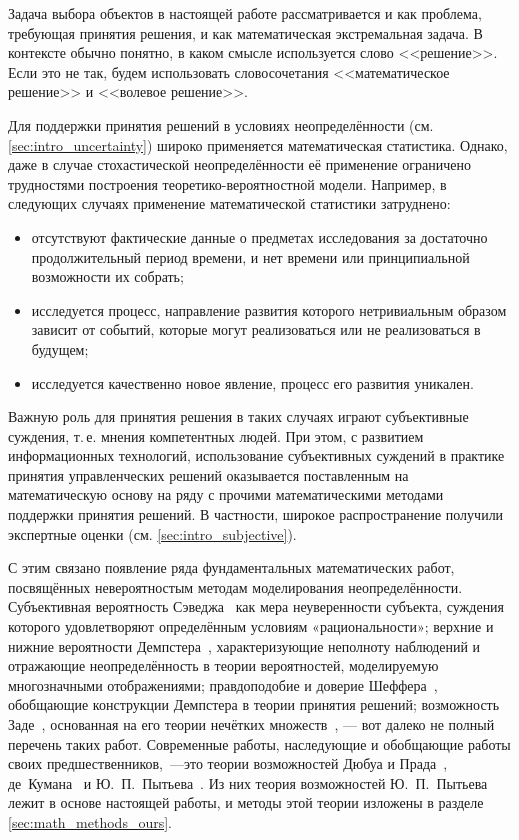 Задача выбора объектов в настоящей работе рассматривается и как проблема, требующая принятия решения, и как математическая экстремальная задача. В контексте обычно понятно, в каком смысле используется слово <<решение>>. Если это не так, будем использовать словосочетания <<математическое решение>> и <<волевое решение>>.
 

Для поддержки принятия решений в условиях неопределённости (см. \ref{sec:intro_uncertainty}) широко применяется математическая статистика. Однако, даже в случае стохастической неопределённости её применение ограничено трудностями построения теоретико-вероятностной модели.  Например, в следующих случаях применение математической статистики затруднено:
\begin{itemize}
 \item отсутствуют фактические данные о предметах исследования за достаточно продолжительный период времени, и нет времени или принципиальной возможности их собрать; 
 \item исследуется процесс, направление развития которого нетривиальным образом зависит от событий, которые могут реализоваться или не реализоваться в будущем;
 \item исследуется качественно новое явление, процесс его развития уникален.
\end{itemize}

Важную роль для принятия решения в таких случаях играют субъективные суждения, т.\,е. мнения компетентных людей. При этом, с развитием информационных технологий, использование субъективных суждений в практике принятия управленческих решений оказывается поставленным на математическую основу на ряду с прочими математическими методами поддержки принятия решений. В частности, широкое распространение получили экспертные оценки (см. \ref{sec:intro_subjective}).

 С этим связано появление ряда фундаментальных математических работ, посвящённых невероятностым методам моделирования неопределённости. Субъективная вероятность Сэведжа~\cite{savage1972foundations} как мера неуверенности субъекта, суждения которого удовлетворяют определённым условиям «рациональности»; верхние и нижние вероятности Демпстера~\cite{dempster}, характеризующие неполноту наблюдений и отражающие неопределённость в теории вероятностей, моделируемую многозначными отображениями; правдоподобие и доверие Шеффера~\cite{shafer}, обобщающие конструкции Демпстера в теории принятия решений; возможность Заде~\cite{citeZadeh}, основанная на его теории нечётких множеств~\cite{ZadehPrime}, — вот далеко не полный перечень таких работ. Современные работы, наследующие и обобщающие работы своих предшественников,~---это теории возможностей Дюбуа и Прада~\cite{dubois_prade-1990, Dubois2015}, де~Кумана~\cite{de1992possibility} и Ю.~П.~Пытьева~\cite{possbook, probbook}. Из них теория возможностей Ю.~П.~Пытьева лежит в основе настоящей работы, и методы этой теории изложены в разделе \ref{sec:math_methods_ours}.  


